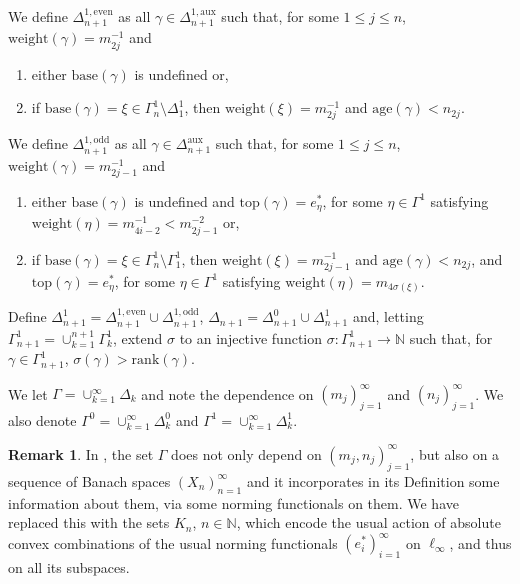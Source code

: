 \documentclass[11pt]{amsart}
\theoremstyle{definition}
\newtheorem{remark}[theorem]{Remark}
\newcommand{\N}{\mathbb{N}}
\numberwithin{equation}{section}
\begin{document}
We define $\Delta_{n+1}^{1,\mathrm{even}}$ as all $\gamma\in\Delta_{n+1}^{1,\mathrm{aux}}$ such that, for some $1\leq j\leq n$, $\mathrm{weight}(\gamma) = m_{2j}^{-1}$ and
\begin{enumerate}[label=(\greek*),leftmargin=19pt]
    \item\label{even no base} either $\mathrm{base}(\gamma)$ is undefined or,
    \item\label{even with base} if $\mathrm{base}(\gamma) = \xi\in\Gamma_n^1\setminus\Delta_1^1$, then $\mathrm{weight}(\xi) = m_{2j}^{-1}$ and $\mathrm{age}(\gamma)< n_{2j}$.
\end{enumerate}
We define $\Delta_{n+1}^{1,\mathrm{odd}}$ as all $\gamma\in\Delta_{n+1}^\mathrm{aux}$ such that, for some $1\leq j\leq n$, $\mathrm{weight}(\gamma) = m_{2j-1}^{-1}$ and
\begin{enumerate}[label=(\greek*),leftmargin=19pt,resume]
    \item\label{odd no base} either $\mathrm{base}(\gamma)$ is undefined and $\mathrm{top}(\gamma) = e_\eta^*$, for some $\eta\in\Gamma^1$ satisfying $\mathrm{weight}(\eta) = m^{-1}_{4i-2} < m_{2j-1}^{-2}$ or,
    \item\label{odd with base} if $\mathrm{base}(\gamma) = \xi\in\Gamma_n^1\setminus\Gamma_1^1$, then $\mathrm{weight}(\xi) = m_{2j-1}^{-1}$ and $\mathrm{age}(\gamma)< n_{2j}$, and $\mathrm{top}(\gamma) = e_\eta^*$, for some $\eta\in\Gamma^1$ satisfying $\mathrm{weight}(\eta) = m_{4\sigma(\xi)}$.
\end{enumerate}
Define $\Delta_{n+1}^1 = \Delta_{n+1}^{1,\mathrm{even}}\cup \Delta_{n+1}^{1,\mathrm{odd}}$, $\Delta_{n+1} = \Delta_{n+1}^0\cup\Delta_{n+1}^1$ and, letting $\Gamma_{n+1}^1 = \cup_{k=1}^{n+1}\Gamma_k^1$, extend $\sigma$ to an injective function $\sigma:\Gamma^1_{n+1}\to \N$ such that, for $\gamma\in\Gamma_{n+1}^1$, $\sigma(\gamma)>\mathrm{rank}(\gamma)$.

We let $\Gamma = \cup_{k=1}^\infty\Delta_k$ and note the dependence on $(m_j)_{j=1}^\infty$ and $(n_j)_{j=1}^\infty$. We also denote $\Gamma^0 = \cup_{k=1}^\infty\Delta_k^0$ and $\Gamma^1 = \cup_{k=1}^\infty\Delta_k^1$.

\begin{remark}
\label{skip norming functionals}
In \cite{zisimopoulou:2014}, the set $\Gamma$ does not only depend on $(m_j,n_j)_{j=1}^\infty$, but also on a sequence of Banach spaces $(X_n)_{n=1}^\infty$ and it incorporates in its Definition some information about them, via some norming functionals on them. We have replaced this with the sets $K_n$, $n\in\N$, which encode the usual action of absolute convex combinations of the usual norming functionals $(e_i^*)_{i=1}^\infty$ on $\ell_\infty$, and thus on all its subspaces.
\end{remark}
\end{document}
